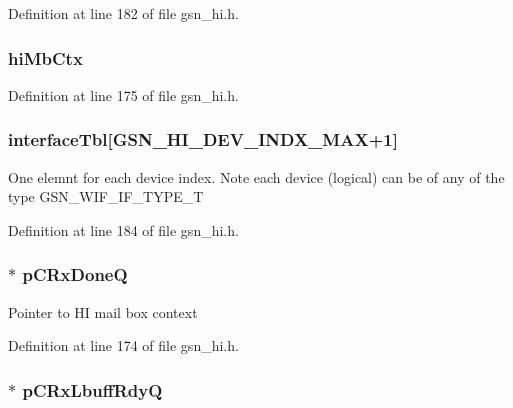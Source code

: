 Definition at line 182 of file gsn\_\-hi.h.

\hypertarget{a00085_a8244053ac39cc74079281d9e974c512a}{
\subsubsection[{hiMbCtx}]{ {\bf hiMbCtx}}}
\label{a00085_a8244053ac39cc74079281d9e974c512a}


Definition at line 175 of file gsn\_\-hi.h.

\hypertarget{a00085_a5d3162115299965cb2068a915dbf22e5}{
\subsubsection[{interfaceTbl}]{ {\bf interfaceTbl}\mbox{[}GSN\_\-HI\_\-DEV\_\-INDX\_\-MAX+1\mbox{]}}}
\label{a00085_a5d3162115299965cb2068a915dbf22e5}
One elemnt for each device index. Note each device (logical) can be of any of the type GSN\_\-WIF\_\-IF\_\-TYPE\_\-T 

Definition at line 184 of file gsn\_\-hi.h.

\hypertarget{a00085_a7581bb1eb817dfb5fe24f45d1b80ea7f}{
\subsubsection[{pCRxDoneQ}]{$\ast$ {\bf pCRxDoneQ}}}
\label{a00085_a7581bb1eb817dfb5fe24f45d1b80ea7f}
Pointer to HI mail box context 

Definition at line 174 of file gsn\_\-hi.h.

\hypertarget{a00085_a79ab5491976d42cddf2dfeb015b8de89}{
\subsubsection[{pCRxLbuffRdyQ}]{$\ast$ {\bf pCRxLbuffRdyQ}}}
\label{a00085_a79ab5491976d42cddf2dfeb015b8de89}


